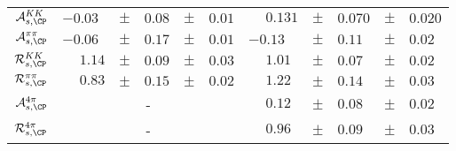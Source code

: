 \begin{table}
\begin{tabular}{rlclcllclcl}
$\mathcal{A}_{s,\CP}^{KK}$ & $-0.03$ & $\pm$ & $0.08$ & $\pm$ & $0.01$ & $\phantom{+}0.131$ & $\pm$ & $0.070$ & $\pm$ & $0.020$ \\
$\mathcal{A}_{s,\CP}^{\pi\pi}$ & $-0.06$ & $\pm$ & $0.17$ & $\pm$ & $0.01$ & $-0.13$ & $\pm$ & $0.11$ & $\pm$ & $0.02$ \\
$\mathcal{R}_{s,\CP}^{KK}$ & $\phantom{+}1.14$ & $\pm$ & $0.09$ & $\pm$ & $0.03$ & $\phantom{+}1.01$ & $\pm$ & $0.07$ & $\pm$ & $0.02$ \\
$\mathcal{R}_{s,\CP}^{\pi\pi}$ & $\phantom{+}0.83$ & $\pm$ & $0.15$ & $\pm$ & $0.02$ & $\phantom{+}1.22$ & $\pm$ & $0.14$ & $\pm$ & $0.03$ \\
$\mathcal{A}_{s,\CP}^{4\pi}$ & \multicolumn{5}{c}{\--} & $\phantom{+}0.12$ & $\pm$ & $0.08$ & $\pm$ & $0.02$ \\
$\mathcal{R}_{s,\CP}^{4\pi}$ & \multicolumn{5}{c}{\--} & $\phantom{+}0.96$ & $\pm$ & $0.09$ & $\pm$ & $0.03$ \\
\end{tabular}
\label{tab:results_split}
\end{table}
